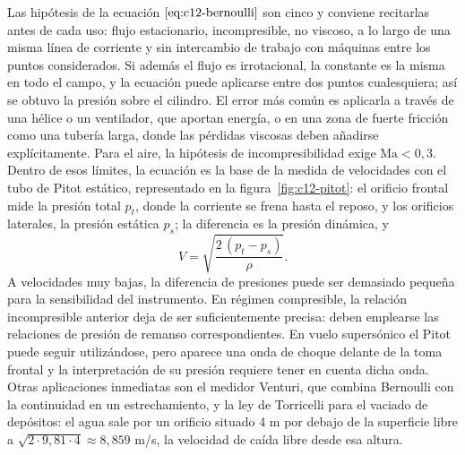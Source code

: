 \documentclass[10pt,openany]{book}
\begin{document}
Las hipótesis de la ecuación \(\eqref{eq:c12-bernoulli}\) son cinco y conviene recitarlas antes de cada uso: flujo estacionario, incompresible, no viscoso, a lo largo de una misma línea de corriente y sin intercambio de trabajo con máquinas entre los puntos considerados. Si además el flujo es irrotacional, la constante es la misma en todo el campo, y la ecuación puede aplicarse entre dos puntos cualesquiera; así se obtuvo la presión sobre el cilindro. El error más común es aplicarla a través de una hélice o un ventilador, que aportan energía, o en una zona de fuerte fricción como una tubería larga, donde las pérdidas viscosas deben añadirse explícitamente. Para el aire, la hipótesis de incompresibilidad exige \(\mathrm{Ma} < 0{,}3\). Dentro de esos límites, la ecuación es la base de la medida de velocidades con el tubo de Pitot estático, representado en la figura~\ref{fig:c12-pitot}: el orificio frontal mide la presión total \(p_t\), donde la corriente se frena hasta el reposo, y los orificios laterales, la presión estática \(p_s\); la diferencia es la presión dinámica, y
\begin{equation}
V = \sqrt{\frac{2\,(p_t - p_s)}{\rho}}. \label{eq:c12-pitot}
\end{equation}
A velocidades muy bajas, la diferencia de presiones puede ser demasiado pequeña para la sensibilidad del instrumento. En régimen compresible, la relación incompresible anterior deja de ser suficientemente precisa: deben emplearse las relaciones de presión de remanso correspondientes. En vuelo supersónico el Pitot puede seguir utilizándose, pero aparece una onda de choque delante de la toma frontal y la interpretación de su presión requiere tener en cuenta dicha onda. Otras aplicaciones inmediatas son el medidor Venturi, que combina Bernoulli con la continuidad en un estrechamiento, y la ley de Torricelli para el vaciado de depósitos: el agua sale por un orificio situado 4 m por debajo de la superficie libre a \(\sqrt{2\cdot 9{,}81\cdot 4} \approx 8{,}859\) m/s, la velocidad de caída libre desde esa altura.
\end{document}
